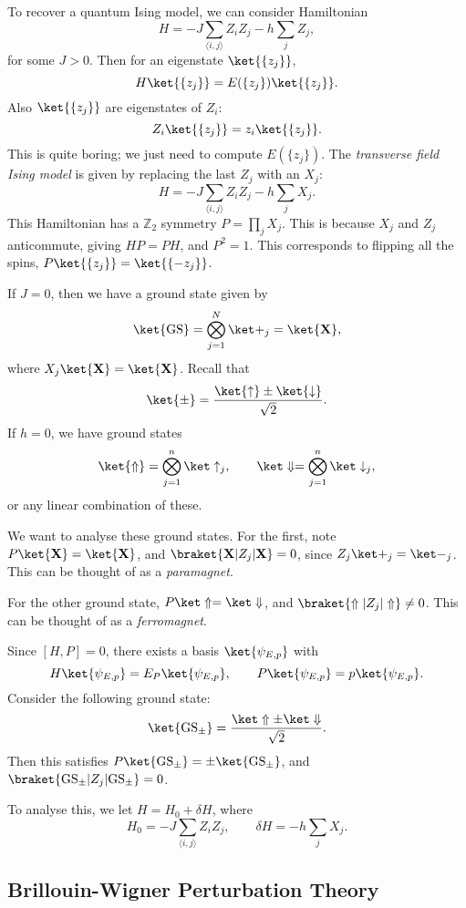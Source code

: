 \documentclass[12pt]{article}
\begin{document}
To recover a quantum Ising model, we can consider Hamiltonian
\[
H = - J \sum_{\langle i, j\rangle} Z_i Z_j - h \sum_j Z_j,
\]
for some $J > 0$. Then for an eigenstate $\ket{\{z_j\}}$,
\[
	H \ket{\{z_j\}} = E(\{z_j\}) \ket{\{z_j\}}.
\]
Also $\ket{\{z_j\}}$ are eigenstates of $Z_i$:
\[
	Z_i \ket{\{z_j\}} = z_i \ket{\{z_j\}}.
\]
This is quite boring; we just need to compute $E(\{z_j\})$. The \emph{transverse field Ising model} is given by replacing the last $Z_j$ with an $X_j$:
\[
H = - J \sum_{\langle i, j\rangle} Z_i Z_j - h \sum_j X_j.
\]
This Hamiltonian has a $\mathbb{Z}_2$ symmetry $P = \prod_j X_j$. This is because $X_j$ and $Z_j$ anticommute, giving $HP = PH$, and $P^2 = 1$. This corresponds to flipping all the spins, $P \ket{\{z_j\}} = \ket{\{-z_j\}}$.

If $J = 0$, then we have a ground state given by
\[
	\ket{\mathrm{GS}} = \bigotimes_{j = 1}^N \ket +_j = \ket{\mathbf{X}},
\]
where $X_j \ket{\mathbf{X}} = \ket{\mathbf{X}}$. Recall that
\[
\ket{\pm} = \frac{\ket{\uparrow} \pm \ket{\downarrow}}{\sqrt 2}.
\]
If $h = 0$, we have ground states
\[
	\ket{\Uparrow} = \bigotimes_{j = 1}^n \ket \uparrow_j, \qquad \ket\Downarrow = \bigotimes_{j = 1}^n \ket \downarrow_j,
\]
or any linear combination of these.

We want to analyse these ground states. For the first, note $P\ket{\mathbf{X}} = \ket{\mathbf{X}}$, and $\braket{\mathbf{X}|Z_j|\mathbf{X}}=0$, since $Z_j \ket + _j = \ket -_j$. This can be thought of as a \emph{paramagnet}.

For the other ground state, $P \ket \Uparrow = \ket \Downarrow$, and $\braket{\Uparrow|Z_j|\Uparrow} \neq 0$. This can be thought of as a \emph{ferromagnet}.

Since $[H, P] = 0$, there exists a basis $\ket{\psi_{E, p}}$ with 
\[
	H \ket{\psi_{E,p}} = E_P \ket{\psi_{E,p}}, \qquad P\ket{\psi_{E,p}} = p \ket{\psi_{E,p}}.
\]
Consider the following ground state:
\[
	\ket{\mathrm{GS}_{\pm}} = \frac{\ket \Uparrow \pm \ket \Downarrow}{\sqrt 2}.
\]
Then this satisfies $P\ket{\mathrm{GS}_{\pm}} = \pm \ket{\mathrm{GS}_{\pm}}$, and $\braket{\mathrm{GS}_{\pm}|Z_j|\mathrm{GS}_{\pm}} = 0$.

To analyse this, we let $H = H_0 + \delta H$, where
\[
H_0 = - J \sum_{\langle i, j\rangle} Z_i Z_j, \qquad \delta H = - h \sum_j X_j.
\]
\subsection{Brillouin-Wigner Perturbation Theory}%
\label{sub:bwpt}
\end{document}
